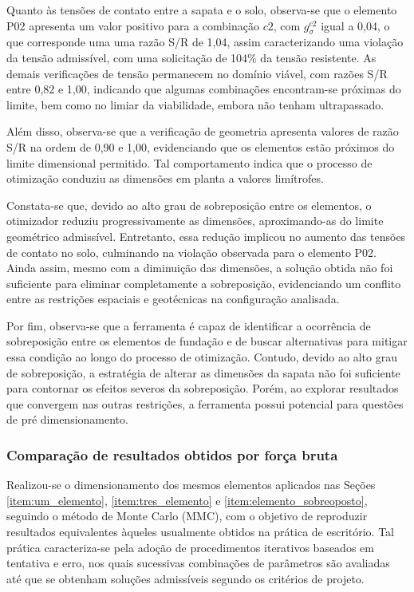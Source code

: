 Quanto às tensões de contato entre a sapata e o solo, observa-se que o elemento P02 apresenta um valor positivo para a combinação $c2$, com $g_{\sigma}^{c2}$ igual a 0,04, o que corresponde uma uma razão S/R de 1,04, assim caracterizando uma violação da tensão admissível, com uma solicitação de 104\% da tensão resistente. As demais verificações de tensão permanecem no domínio viável, com razões S/R entre 0,82 e 1,00, indicando que algumas combinações encontram-se próximas do limite, bem como no limiar da viabilidade, embora não tenham ultrapassado.

Além disso, observa-se que a verificação de geometria apresenta valores de razão S/R na ordem de 0,90 e 1,00, evidenciando que os elementos estão próximos do limite dimensional permitido. Tal comportamento indica que o processo de otimização conduziu as dimensões em planta a valores limítrofes.

Constata-se que, devido ao alto grau de sobreposição entre os elementos, o otimizador reduziu progressivamente as dimensões, aproximando-as do limite geométrico admissível.  Entretanto, essa redução implicou no aumento das tensões de contato no solo, culminando na violação observada para o elemento P02. Ainda assim, mesmo com a diminuição das dimensões, a solução obtida não foi suficiente para eliminar completamente a sobreposição, evidenciando um conflito entre as restrições espaciais e geotécnicas na configuração analisada.

Por fim, observa-se que a ferramenta é capaz de identificar a ocorrência de sobreposição entre os elementos de fundação e de buscar alternativas para mitigar essa condição ao longo do processo de otimização. Contudo, devido ao alto grau de sobreposição, a estratégia de alterar as dimensões da sapata não foi suficiente para contornar os efeitos severos da sobreposição. Porém, ao explorar resultados que convergem nas outras restrições, a ferramenta possui potencial para questões de pré dimensionamento.


\subsubsection{Comparação de resultados obtidos por força bruta}
\label{subsubsub:comparacao}

Realizou-se o dimensionamento dos mesmos elementos aplicados nas Seções \ref{item:um_elemento}, \ref{item:tres_elemento} e \ref{item:elemento_sobreoposto}, seguindo o método de Monte Carlo (MMC), com o objetivo de reproduzir resultados equivalentes àqueles usualmente obtidos na prática de escritório. Tal prática caracteriza-se pela adoção de procedimentos iterativos baseados em tentativa e erro, nos quais sucessivas combinações de parâmetros são avaliadas até que se obtenham soluções admissíveis segundo os critérios de projeto.

